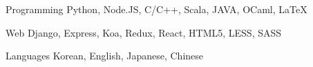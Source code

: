 

\begin{cvskills}

  \cvskill
    {Programming} %
    {Python, Node.JS, C/C++, Scala, JAVA, OCaml, LaTeX} %

  \cvskill
    {Web} %
    {Django, Express, Koa, Redux, React, HTML5, LESS, SASS} %

  \cvskill
    {Languages} %
    {Korean, English, Japanese, Chinese} %

\end{cvskills}
